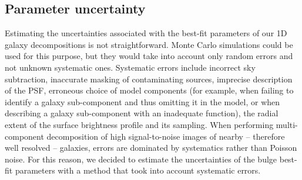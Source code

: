 \documentclass[preprint2]{emulateapj}
\begin{document}
\subsection{Parameter uncertainty}
\label{sec:err}
Estimating the uncertainties associated with the best-fit parameters of our 1D galaxy decompositions is not straightforward.
Monte Carlo simulations could be used for this purpose, 
but they would take into account only random errors and not unknown systematic ones.
Systematic errors include incorrect sky subtraction, 
inaccurate masking of contaminating sources, 
imprecise description of the PSF, 
erroneous choice of model components 
(for example, when failing to identify a galaxy sub-component and thus omitting it in the model, 
or when describing a galaxy sub-component with an inadequate function),
the radial extent of the surface brightness profile and its sampling.
When performing multi-component decomposition of high signal-to-noise images of nearby -- therefore well resolved -- galaxies, 
errors are dominated by systematics rather than Poisson noise.
For this reason, we decided to estimate the uncertainties of the bulge best-fit parameters 
with a method that took into account systematic errors. 
\end{document}
